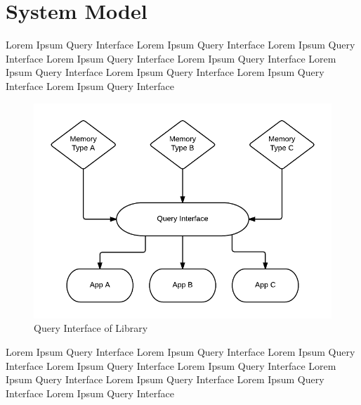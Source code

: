 \documentclass{sig-alternate}
\begin{document}
\section{System Model}
\label{sec:sysmodel}

Lorem Ipsum Query Interface
Lorem Ipsum Query Interface
Lorem Ipsum Query Interface
Lorem Ipsum Query Interface
Lorem Ipsum Query Interface
Lorem Ipsum Query Interface
Lorem Ipsum Query Interface
Lorem Ipsum Query Interface
Lorem Ipsum Query Interface


\begin{figure}[H]
	\begin{center}
		\includegraphics[width=1\linewidth]{queryint}
	\end{center}
	\vspace{-12pt}
	\caption{Query Interface of Library}
	\label{fig:queryint}
\end{figure}

Lorem Ipsum Query Interface
Lorem Ipsum Query Interface
Lorem Ipsum Query Interface
Lorem Ipsum Query Interface
Lorem Ipsum Query Interface
Lorem Ipsum Query Interface
Lorem Ipsum Query Interface
Lorem Ipsum Query Interface
Lorem Ipsum Query Interface
\end{document}
